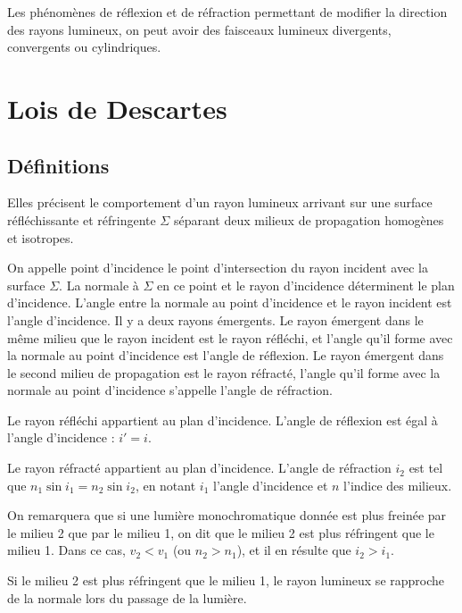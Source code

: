 Les phénomènes de réflexion et de réfraction permettant de modifier la direction des rayons lumineux, on peut avoir des faisceaux lumineux divergents, convergents ou cylindriques.

\section{Lois de Descartes}
\label{chap6-sec:LoisdeSnellDescartes}

\subsection{Définitions}
\label{chap6-subsec:définitions}

Elles précisent le comportement d'un rayon lumineux arrivant sur une surface réfléchissante et réfringente $\Sigma$ séparant deux milieux de propagation homogènes et isotropes.

On appelle point d'incidence le point d'intersection du rayon incident avec la surface $\Sigma$. La normale à $\Sigma$ en ce point et le rayon d'incidence déterminent le plan d'incidence. L'angle entre la normale au point d'incidence et le rayon incident est l'angle d'incidence. Il y a deux rayons émergents. Le rayon émergent dans le même milieu que le rayon incident est le rayon réfléchi, et l'angle qu'il forme avec la normale au point d'incidence est l'angle de réflexion. Le rayon émergent dans le second milieu de propagation est le rayon réfracté, l'angle qu'il forme avec la normale au point d'incidence s'appelle l'angle de réfraction.

\begin{theo}
  Le rayon réfléchi appartient au plan d'incidence. L'angle de réflexion est égal à l'angle d'incidence : $i'=i$.
\end{theo}
\begin{theo}
  Le rayon réfracté appartient au plan d'incidence. L'angle de réfraction $i_2$ est tel que $n_1 \sin i_1 = n_2 \sin i_2$, en notant $i_1$ l'angle d'incidence et $n$ l'indice des milieux.
\end{theo}

On remarquera que si une lumière monochromatique donnée est plus freinée par le milieu 2 que par le milieu 1, on dit que le milieu 2 est plus réfringent que le milieu 1. Dans ce cas, $v_2 < v_1$ (ou $n_2 > n_1$), et il en résulte que $i_2 > i_1$.

Si le milieu 2 est plus réfringent que le milieu 1, le rayon lumineux se rapproche de la normale lors du passage de la lumière.

